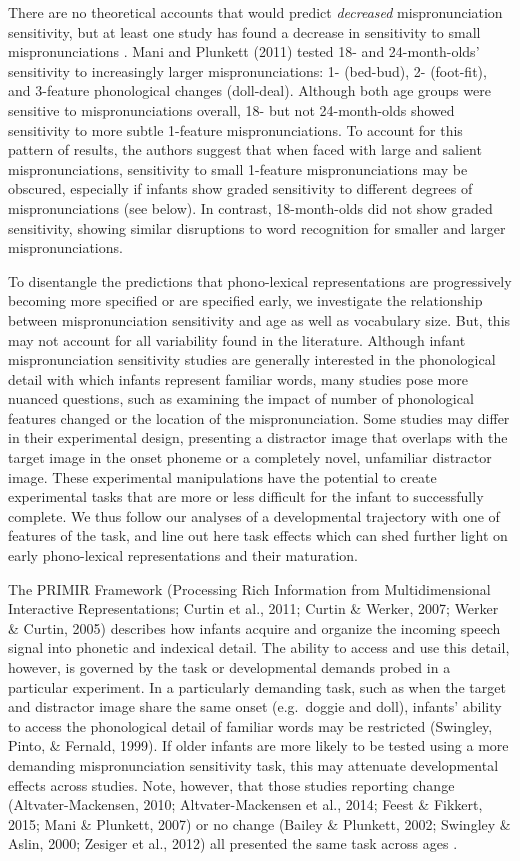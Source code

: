 \documentclass[man]{apa6}
\begin{document}
There are no theoretical accounts that would predict \emph{decreased} mispronunciation sensitivity, but at least one study has found a decrease in sensitivity to small mispronunciations . Mani and Plunkett (2011) tested 18- and 24-month-olds' sensitivity to increasingly larger mispronunciations: 1- (bed-bud), 2- (foot-fit), and 3-feature phonological changes (doll-deal). Although both age groups were sensitive to mispronunciations overall, 18- but not 24-month-olds showed sensitivity to more subtle 1-feature mispronunciations. To account for this pattern of results, the authors suggest that when faced with large and salient mispronunciations, sensitivity to small 1-feature mispronunciations may be obscured, especially if infants show graded sensitivity to different degrees of mispronunciations (see below). In contrast, 18-month-olds did not show graded sensitivity, showing similar disruptions to word recognition for smaller and larger mispronunciations.

To disentangle the predictions that phono-lexical representations are progressively becoming more specified or are specified early, we investigate the relationship between mispronunciation sensitivity and age as well as vocabulary size. But, this may not account for all variability found in the literature. Although infant mispronunciation sensitivity studies are generally interested in the phonological detail with which infants represent familiar words, many studies pose more nuanced questions, such as examining the impact of number of phonological features changed or the location of the mispronunciation. Some studies may differ in their experimental design, presenting a distractor image that overlaps with the target image in the onset phoneme or a completely novel, unfamiliar distractor image. These experimental manipulations have the potential to create experimental tasks that are more or less difficult for the infant to successfully complete. We thus follow our analyses of a developmental trajectory with one of features of the task, and line out here task effects which can shed further light on early phono-lexical representations and their maturation.

The PRIMIR Framework (Processing Rich Information from Multidimensional Interactive Representations; Curtin et al., 2011; Curtin \& Werker, 2007; Werker \& Curtin, 2005) describes how infants acquire and organize the incoming speech signal into phonetic and indexical detail. The ability to access and use this detail, however, is governed by the task or developmental demands probed in a particular experiment. In a particularly demanding task, such as when the target and distractor image share the same onset (e.g.~doggie and doll), infants' ability to access the phonological detail of familiar words may be restricted (Swingley, Pinto, \& Fernald, 1999). If older infants are more likely to be tested using a more demanding mispronunciation sensitivity task, this may attenuate developmental effects across studies. Note, however, that those studies reporting change (Altvater-Mackensen, 2010; Altvater-Mackensen et al., 2014; Feest \& Fikkert, 2015; Mani \& Plunkett, 2007) or no change (Bailey \& Plunkett, 2002; Swingley \& Aslin, 2000; Zesiger et al., 2012) all presented the same task across ages .
\end{document}
